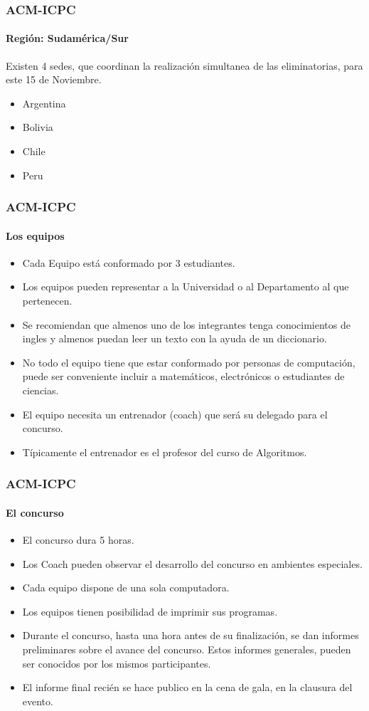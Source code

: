 \documentclass{beamer}
\begin{document}
\begin{frame}
 \frametitle{ACM-ICPC}
 \framesubtitle{Región: Sudamérica/Sur}
 Existen 4 sedes, que coordinan la realización simultanea de las eliminatorias, para este 15 de Noviembre.
 \begin{itemize}
  \item Argentina
  \item Bolivia
  \item Chile
  \item Peru
 \end{itemize}
\end{frame}

\begin{frame}
 \frametitle{ACM-ICPC}
 \framesubtitle{Los equipos}
 \begin{itemize}
  \item Cada Equipo está conformado por 3 estudiantes.
  \item Los equipos pueden representar a la Universidad o al Departamento al que pertenecen.
  \item Se recomiendan que almenos uno de los integrantes tenga conocimientos de ingles y almenos puedan leer un texto con la ayuda de un diccionario.
  \item No todo el equipo tiene que estar conformado por personas de computación, puede ser conveniente incluir a matemáticos, electrónicos o estudiantes de ciencias.
  \item El equipo necesita un entrenador (coach) que será su delegado para el concurso.
  \item Típicamente el entrenador es el profesor del curso de Algoritmos. 
 \end{itemize}
\end{frame}

\begin{frame}
 \frametitle{ACM-ICPC}
 \framesubtitle{El concurso}
 \begin{itemize}
  \item El concurso dura 5 horas.
  \item Los Coach pueden observar el desarrollo del concurso en ambientes especiales.
  \item Cada equipo dispone de una sola computadora.
  \item Los equipos tienen posibilidad de imprimir sus programas.
  \item Durante el concurso, hasta una hora antes de su finalización, se dan informes preliminares sobre el avance del concurso. Estos informes generales, pueden ser conocidos por los mismos participantes.
  \item El informe final recién se hace publico en la cena de gala, en la clausura del evento.
 \end{itemize}
\end{frame}
\end{document}
